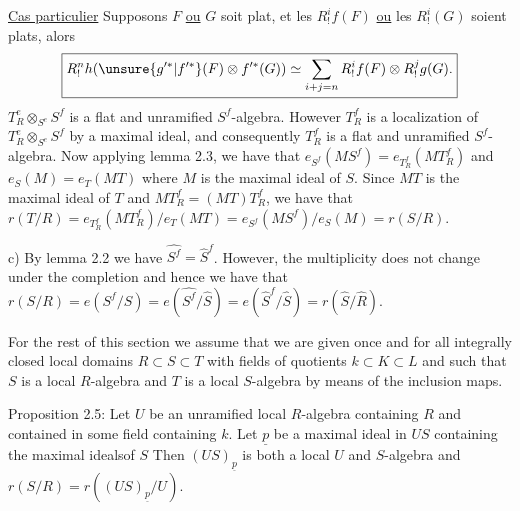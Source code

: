\uline{Cas particulier} Supposons
$F$ \uline{ou} $G$ soit plat, et
les $R_!^if(F)$ \uline{ou} les $R_!^i(G)$ soient plats, alors
\[
\boxed{R_!^nh(\unsure{g'^*|f'^*}(F)\otimes f'^*(G))\simeq
\sum_{i+j=n}R_!^if(F)\otimes R_!^jg(G).}
\]
$T_R^e\otimes_{S^e}S^f$ is a flat and unramified $S^f$-algebra. However $T_R^f$ is a localization
of $T_R^e\otimes_{S^e}S^f$ by a maximal ideal, and consequently $T_R^f$ is a flat and
unramified $S^f$-algebra. Now applying lemma 2.3, we have that $e_{S^f}(MS^f)=
e_{T_R^f}(MT_R^f)$ and $e_S(M)=e_T(MT)$ where $M$ is the maximal ideal of $S$. Since $MT$
is the maximal ideal of $T$ and $MT_R^f=(MT)T_R^f$, we have that $r(T/R)=e_{T_R^f}(MT_R^f)/e_T(MT)
=e_{S^f}(MS^f)/e_S(M)=r(S/R)$.

c) By lemma 2.2 we have $\widehat{S^f}=\widehat S^f$. However, the multiplicity does not
change under the completion and hence we have that $r(S/R)=e(S^f/S)=
e(\widehat{S^f}/\widehat S)=e(\widehat S^f/\widehat S)=r(\widehat S/\widehat R)$.

For the rest of this section we assume that we are given once and for
all integrally closed local domains $R\subset S\subset T$ with fields of quotients
$k\subset K\subset L$ and such that $S$ is a local $R$-algebra and $T$ is a local $S$-algebra
by means of the inclusion maps.

Proposition 2.5: Let $U$ be an unramified local $R$-algebra containing $R$
and contained in some field containing $k$. Let $\underline p$ be a maximal ideal in $US$
containing the maximal idealsof $S$ Then $(US)_{\underline p}$ is both a local $U$ and
$S$-algebra and $r(S/R)=r((US)_{\underline p}/U)$.

